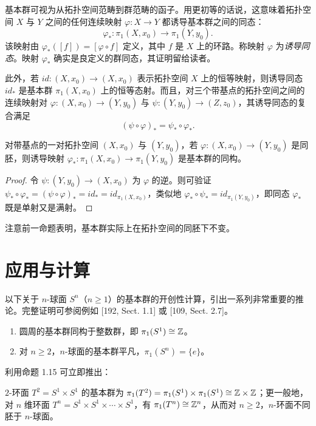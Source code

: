 基本群可视为从拓扑空间范畴到群范畴的函子。用更初等的话说，这意味着拓扑空间 $X$ 与 $Y$ 之间的任何连续映射 $\varphi\colon X\to Y$ 都诱导基本群之间的同态：
\[
\varphi_*\colon\pi_1(X,x_0)\to\pi_1(Y,y_0).
\]
该映射由 $\varphi_*([f])=[\varphi\circ f]$ 定义，其中 $f$ 是 $X$ 上的环路。称映射 $\varphi$ 为\emph{诱导同态}。映射 $\varphi_*$ 确实是良定义的群同态，其证明留给读者。

此外，若 $id\colon(X,x_0)\to(X,x_0)$ 表示拓扑空间 $X$ 上的恒等映射，则诱导同态 $id_*$ 是基本群 $\pi_1(X,x_0)$ 上的恒等态射。而且，对三个带基点的拓扑空间之间的连续映射对 $\varphi\colon(X,x_0)\to(Y,y_0)$ 与 $\psi\colon(Y,y_0)\to(Z,z_0)$，其诱导同态的复合满足
\[
(\psi\circ\varphi)_*=\psi_*\circ\varphi_*.
\]

\begin{proposition}[1.16]
对带基点的一对拓扑空间 $(X,x_0)$ 与 $(Y,y_0)$，若 $\varphi\colon(X,x_0)\to(Y,y_0)$ 是同胚，则诱导映射 $\varphi_*\colon\pi_1(X,x_0)\to\pi_1(Y,y_0)$ 是基本群的同构。
\end{proposition}

\begin{proof}
令 $\psi\colon(Y,y_0)\to(X,x_0)$ 为 $\varphi$ 的逆。则可验证 $\psi_*\circ\varphi_*=(\psi\circ\varphi)_*=id_*=id_{\pi_1(X,x_0)}$，类似地 $\varphi_*\circ\psi_*=id_{\pi_1(Y,y_0)}$，即同态 $\varphi_*$ 既是单射又是满射。
\end{proof}

注意前一命题表明，基本群实际上在拓扑空间的同胚下不变。

\section{应用与计算}

以下关于 $n$-球面 $S^n$（$n\ge1$）的基本群的开创性计算，引出一系列非常重要的推论。完整证明可参阅例如 [192, Sect. 1.1] 或 [109, Sect. 2.7]。

\begin{theorem}[1.17]
\begin{enumerate}
\item 圆周的基本群同构于整数群，即 $\pi_1(S^1)\cong\mathbb{Z}$。
\item 对 $n\ge2$，$n$-球面的基本群平凡，$\pi_1(S^n)=\{e\}$。
\end{enumerate}
\end{theorem}

利用命题 1.15 可立即推出：

\begin{corollary}[1.18]
$2$-环面 $T^2=S^1\times S^1$ 的基本群为 $\pi_1(T^2)=\pi_1(S^1)\times\pi_1(S^1)\cong\mathbb{Z}\times\mathbb{Z}$；更一般地，对 $n$ 维环面 $T^n=S^1\times S^1\times\cdots\times S^1$，有 $\pi_1(T^n)\cong\mathbb{Z}^n$，从而对 $n\ge2$，$n$-环面不同胚于 $n$-球面。
\end{corollary}

